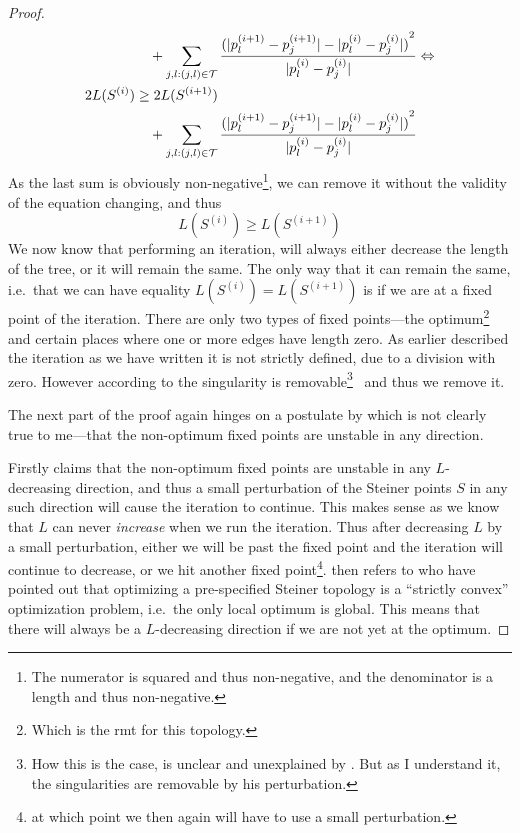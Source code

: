 \begin{proof}
\begin{align}
  &\quad + \sum_{j, l : (j,l) \in \mathcal{T}}
    \frac{{(|p_l^{(i+1)}-p_j^{(i+1)}| - |p_l^{(i)}-p_j^{(i)}|)}^2}{|p_l^{(i)}-p_j^{(i)}|} \Leftrightarrow \\
  2 L(S^{(i)}) &\ge 2 L(S^{(i+1)}) \\
  &\quad + \sum_{j, l : (j,l) \in \mathcal{T}}
    \frac{{(|p_l^{(i+1)}-p_j^{(i+1)}| - |p_l^{(i)}-p_j^{(i)}|)}^2}{|p_l^{(i)}-p_j^{(i)}|}
\end{align}
%
As the last sum is obviously non-negative\footnote{The numerator is squared and
  thus non-negative, and the denominator is a length and thus non-negative.}, we
can remove it without the validity of the equation changing, and thus
%
\begin{equation}
  L(S^{(i)}) \ge L(S^{(i+1)})
\end{equation}
%
We now know that performing an iteration, will always either decrease the length
of the tree, or it will remain the same. The only way that it can remain the
same, i.e.\ that we can have equality $L(S^{(i)}) = L(S^{(i+1)})$ is if we are
at a fixed point of the iteration. There are only two types of fixed
points---the optimum\footnote{Which is the \ac{rmt} for this topology.} and
certain places where one or more edges have length zero. As earlier described
the iteration as we have written it is not strictly defined, due to a division
with zero. However according to \citeauthor{smith1992} the singularity is
removable\footnote{How this is the case, is unclear and unexplained by
  \citeauthor{smith1992}. But as I understand it, the singularities are
  removable by his perturbation.}~\cite{removablesingularity} and thus we remove it.

The next part of the proof again hinges on a postulate by \citeauthor{smith1992}
which is not clearly true to me---that the non-optimum fixed points are unstable
in any direction.

Firstly \citeauthor{smith1992} claims that the non-optimum fixed points are
unstable in any $L$-decreasing direction, and thus a small perturbation of the
Steiner points $S$ in any such direction will cause the iteration to
continue. This makes sense as we know that $L$ can never \textit{increase} when
we run the iteration. Thus after decreasing $L$ by a small perturbation, either
we will be past the fixed point and the iteration will continue to decrease, or
we hit another fixed point\footnote{at which point we then again will have to
  use a small perturbation.}. \citeauthor{smith1992} then refers to
\textcite{gilbert1968} who have pointed out that optimizing a pre-specified
Steiner topology is a ``strictly convex'' optimization problem, i.e.\ the only
local optimum is global. This means that there will always be a $L$-decreasing
direction if we are not yet at the optimum.


\end{proof}
